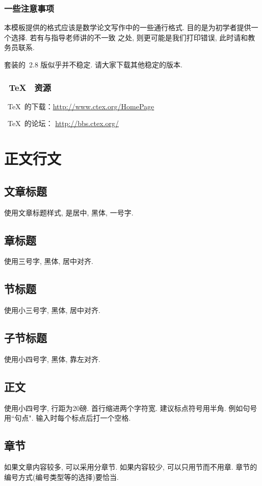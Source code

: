 \documentclass[notitlepage,cs4size,punct,oneside]{ctexrep}
\numberwithin{equation}{chapter}
\theoremstyle{mystyle}
\begin{document}
\subsection{一些注意事项}
本模板提供的格式应该是数学论文写作中的一些通行格式. 目的是为初学者提供一个选择. 若有与指导老师讲的不一致
之处, 则更可能是我们打印错误, 此时请和教务员联系.

\CTeX 套装的~2.8 版似乎并不稳定. 请大家下载其他稳定的版本.

\subsection{~\TeX~ 资源}
~\TeX~的下载：\href{http://www.ctex.org/HomePage}{http://www.ctex.org/HomePage}

~\TeX~的论坛： \href{http://bbs.ctex.org/}{http://bbs.ctex.org/}


\chapter{正文行文}
\section{文章标题}
使用文章标题样式, 是居中, 黑体, 一号字.

\section{章标题}
使用三号字, 黑体, 居中对齐.

\section{节标题}
使用小三号字, 黑体, 居中对齐.

\section{子节标题}
使用小四号字, 黑体, 靠左对齐.

\section{正文}
使用小四号字, 行距为20磅. 首行缩进两个字符宽. 建议标点符号用半角.
例如句号用``句点". 输入时每个标点后打一个空格.

\section{章节} 如果文章内容较多, 可以采用分章节. 如果内容较少, 可以只用节而不用章. 章节的编号方式(编号类型等的选择)要恰当.
\end{document}
